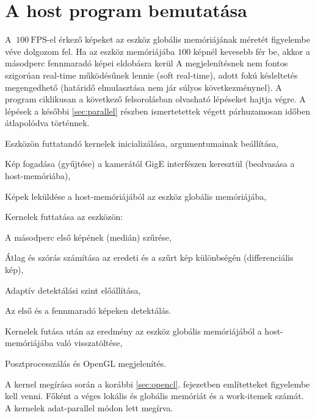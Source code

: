 \chapter{A host program bemutatása}
	A $~100\ \mathrm{FPS}$-el érkező képeket az eszköz globális memóriájának méretét figyelembe véve dolgozom fel.
	Ha az eszköz memóriájába $100$ képnél kevesebb fér be, akkor a másodperc fennmaradó képei eldobásra kerül 
	A megjelenítésnek nem fontos szigorúan real-time működésűnek lennie (soft real-time), adott fokú késleltetés megengedhető 
	(határidő elmulasztása nem jár súlyos következménynel). A program ciklikusan a következő felsorolásban olvasható lépéseket hajtja
	végre. A lépések a későbbi \ref{sec:parallel} részben ismertetettek végett párhuzamosan időben átlapolódva történnek. 
	\begin{enumerate*}
		\item Eszközön futtatandó kernelek inicializálása, argumentumainak beállítása,
		\item Kép fogadása (gyűjtése) a kamerától GigE interfészen keresztül (beolvasása a host-memóriába),
		\item Képek leküldése a host-memóriájából az eszköz globális memóriájába,
		\item Kernelek futtatása az eszközön:
		\begin{enumerate*}
			\item A másodperc első képének (medián) szűrése,
			\item Átlag és szórás számítása az eredeti és a szűrt kép különbségén (differenciális kép),
			\item Adaptív detektálási szint előállítása,
			\item Az első és a fennmaradó képeken detektálás.
		\end{enumerate*}
		\item Kernelek futása után az eredmény az eszköz globális memóriájából a host-memóriájába való
		visszatöltése,
		\item Posztprocesszálás és OpenGL megjelenítés.
	\end{enumerate*}
	A kernel megírása során a korábbi \ref{sec:opencl}. fejezetben említetteket figyelembe kell venni.
	Főként a véges lokális és globális memóriát és a work-itemek számát. A kernelek adat-parallel módon lett megírva.
	
